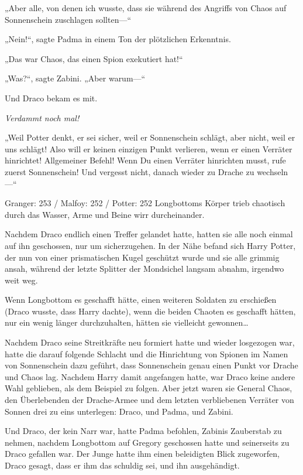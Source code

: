 {„Aber alle, von denen ich wusste, dass sie während des Angriffs von Chaos auf Sonnenschein zuschlagen sollten—“

„Nein!“, sagte Padma in einem Ton der plötzlichen Erkenntnis.

„Das war Chaos, das einen Spion exekutiert hat!“

„Was?“, sagte Zabini. „Aber warum—“

Und Draco bekam es mit.

\emph{Verdammt noch mal!}

„Weil Potter denkt, er sei sicher, weil er Sonnenschein schlägt, aber nicht, weil er uns schlägt! Also will er keinen einzigen Punkt verlieren, wenn er einen Verräter hinrichtet! Allgemeiner Befehl! Wenn Du einen Verräter hinrichten musst, rufe zuerst Sonnenschein! Und vergesst nicht, danach wieder zu Drache zu wechseln—“

Granger: 253 / Malfoy: 252 / Potter: 252 Longbottoms Körper trieb chaotisch durch das Wasser, Arme und Beine wirr durcheinander.

Nachdem Draco endlich einen Treffer gelandet hatte, hatten sie alle noch einmal auf ihn geschossen, nur um sicherzugehen. In der Nähe befand sich Harry Potter, der nun von einer prismatischen Kugel geschützt wurde und sie alle grimmig ansah, während der letzte Splitter der Mondsichel langsam abnahm, irgendwo weit weg.

Wenn Longbottom es geschafft hätte, einen weiteren Soldaten zu erschießen (Draco wusste, dass Harry dachte), wenn die beiden Chaoten es geschafft hätten, nur ein wenig länger durchzuhalten, hätten sie vielleicht gewonnen…

Nachdem Draco seine Streitkräfte neu formiert hatte und wieder losgezogen war, hatte die darauf folgende Schlacht und die Hinrichtung von Spionen im Namen von Sonnenschein dazu geführt, dass Sonnenschein genau einen Punkt vor Drache und Chaos lag. Nachdem Harry damit angefangen hatte, war Draco keine andere Wahl geblieben, als dem Beispiel zu folgen. Aber jetzt waren sie General Chaos, den Überlebenden der Drache-Armee und dem letzten verbliebenen Verräter von Sonnen drei zu eins unterlegen: Draco, und Padma, und Zabini.

Und Draco, der kein Narr war, hatte Padma befohlen, Zabinis Zauberstab zu nehmen, nachdem Longbottom auf Gregory geschossen hatte und seinerseits zu Draco gefallen war. Der Junge hatte ihm einen beleidigten Blick zugeworfen, Draco gesagt, dass er ihm das schuldig sei, und ihn ausgehändigt.

}
